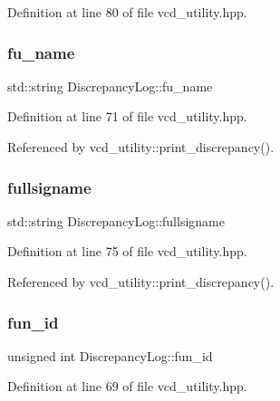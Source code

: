 Definition at line 80 of file vcd\+\_\+utility.\+hpp.

\mbox{\label{structDiscrepancyLog_acdf435913892d9b8128df9c02bf1d0e6}} 
\subsubsection{\texorpdfstring{fu\+\_\+name}{fu\_name}}
{\footnotesize\ttfamily std\+::string Discrepancy\+Log\+::fu\+\_\+name}



Definition at line 71 of file vcd\+\_\+utility.\+hpp.



Referenced by vcd\+\_\+utility\+::print\+\_\+discrepancy().

\mbox{\label{structDiscrepancyLog_acf7b7677212c41f10c7dbe2cf0b5a015}} 
\subsubsection{\texorpdfstring{fullsigname}{fullsigname}}
{\footnotesize\ttfamily std\+::string Discrepancy\+Log\+::fullsigname}



Definition at line 75 of file vcd\+\_\+utility.\+hpp.



Referenced by vcd\+\_\+utility\+::print\+\_\+discrepancy().

\mbox{\label{structDiscrepancyLog_a702e53525b84be4290e7c442ed1421ba}} 
\subsubsection{\texorpdfstring{fun\+\_\+id}{fun\_id}}
{\footnotesize\ttfamily unsigned int Discrepancy\+Log\+::fun\+\_\+id}



Definition at line 69 of file vcd\+\_\+utility.\+hpp.



